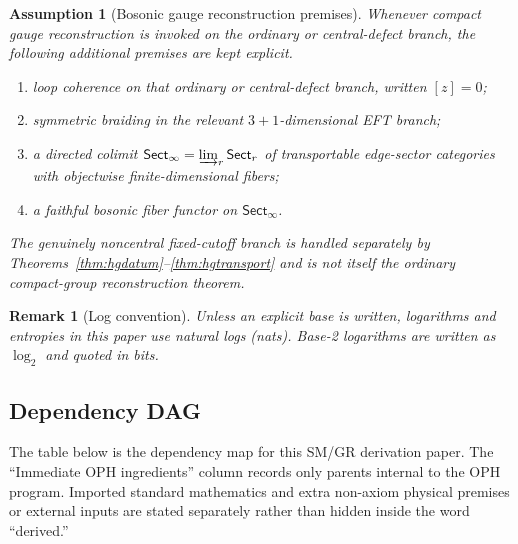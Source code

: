 \documentclass[11pt]{article}
\newtheorem{assumption}[theorem]{Assumption}
\newtheorem{remark}[theorem]{Remark}
\begin{document}
\begin{assumption}[Bosonic gauge reconstruction premises]\label{ass:gaugeprem}
Whenever compact gauge reconstruction is invoked on the ordinary or central-defect branch, the following additional premises are kept explicit.
\begin{enumerate}[label=(G\arabic*),leftmargin=2.3em]
\item loop coherence on that ordinary or central-defect branch, written \([z]=0\);
\item symmetric braiding in the relevant \(3+1\)-dimensional EFT branch;
\item a directed colimit \(\mathsf{Sect}_\infty=\varinjlim_r \mathsf{Sect}_r\) of transportable edge-sector categories with objectwise finite-dimensional fibers;
\item a faithful bosonic fiber functor on \(\mathsf{Sect}_\infty\).
\end{enumerate}
The genuinely noncentral fixed-cutoff branch is handled separately by Theorems~\ref{thm:hgdatum}--\ref{thm:hgtransport} and is not itself the ordinary compact-group reconstruction theorem.
\end{assumption}

\begin{remark}[Log convention]
Unless an explicit base is written, logarithms and entropies in this paper use natural logs (nats). Base-2 logarithms are written as \(\log_2\) and quoted in bits.
\end{remark}

\subsection*{Dependency DAG}

The table below is the dependency map for this SM/GR derivation paper. The ``Immediate OPH ingredients'' column records only parents internal to the OPH program. Imported standard mathematics and extra non-axiom physical premises or external inputs are stated separately rather than hidden inside the word ``derived.''
\end{document}
